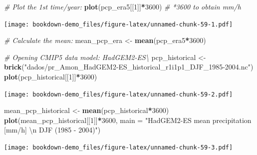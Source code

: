 \documentclass[]{book}
\newenvironment{Shaded}{\begin{snugshade}}{\end{snugshade}}
\newcommand{\CharTok}[1]{\textcolor[rgb]{0.31,0.60,0.02}{#1}}
\newcommand{\CommentTok}[1]{\textcolor[rgb]{0.56,0.35,0.01}{\textit{#1}}}
\newcommand{\DataTypeTok}[1]{\textcolor[rgb]{0.13,0.29,0.53}{#1}}
\newcommand{\DecValTok}[1]{\textcolor[rgb]{0.00,0.00,0.81}{#1}}
\newcommand{\KeywordTok}[1]{\textcolor[rgb]{0.13,0.29,0.53}{\textbf{#1}}}
\newcommand{\NormalTok}[1]{#1}
\newcommand{\OperatorTok}[1]{\textcolor[rgb]{0.81,0.36,0.00}{\textbf{#1}}}
\newcommand{\StringTok}[1]{\textcolor[rgb]{0.31,0.60,0.02}{#1}}
\begin{document}
\begin{Shaded}
\begin{Highlighting}[]
\CommentTok{# Plot the 1st time/year:}
\KeywordTok{plot}\NormalTok{(pcp_era5[[}\DecValTok{1}\NormalTok{]]}\OperatorTok{*}\DecValTok{3600}\NormalTok{)      }\CommentTok{# *3600 to obtain mm/h}
\end{Highlighting}
\end{Shaded}

\texttt{[image: bookdown-demo\_files/figure-latex/unnamed-chunk-59-1.pdf]}

\begin{Shaded}
\begin{Highlighting}[]
\CommentTok{# Calculate the mean:}
\NormalTok{mean_pcp_era <-}\StringTok{ }\KeywordTok{mean}\NormalTok{(pcp_era5}\OperatorTok{*}\DecValTok{3600}\NormalTok{)}

\CommentTok{# Opening CMIP5 data model: HadGEM2-ES\textbackslash{}}
\NormalTok{pcp_historical <-}\StringTok{ }\KeywordTok{brick}\NormalTok{(}\StringTok{"dados/pr_Amon_HadGEM2-ES_historical_r1i1p1_DJF_1985-2004.nc"}\NormalTok{)}
\KeywordTok{plot}\NormalTok{(pcp_historical[[}\DecValTok{1}\NormalTok{]]}\OperatorTok{*}\DecValTok{3600}\NormalTok{)}
\end{Highlighting}
\end{Shaded}

\texttt{[image: bookdown-demo\_files/figure-latex/unnamed-chunk-59-2.pdf]}

\begin{Shaded}
\begin{Highlighting}[]
\NormalTok{mean_pcp_historical <-}\StringTok{ }\KeywordTok{mean}\NormalTok{(pcp_historical}\OperatorTok{*}\DecValTok{3600}\NormalTok{)}
\KeywordTok{plot}\NormalTok{(mean_pcp_historical[[}\DecValTok{1}\NormalTok{]]}\OperatorTok{*}\DecValTok{3600}\NormalTok{,}
     \DataTypeTok{main =} \StringTok{"HadGEM2-ES mean precipitation [mm/h] }\CharTok{\textbackslash{}n}\StringTok{ DJF (1985 - 2004)"}\NormalTok{)}
\end{Highlighting}
\end{Shaded}

\texttt{[image: bookdown-demo\_files/figure-latex/unnamed-chunk-59-3.pdf]}
\end{document}
